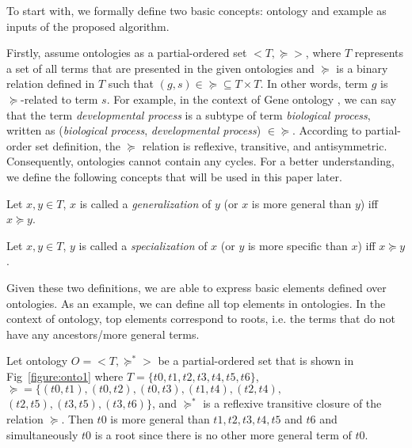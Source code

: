 

To start with, we formally define two basic concepts: ontology and example as inputs of the proposed algorithm. 

Firstly, assume ontologies as a partial-ordered set $<T,\succeq>$, where $T$ represents a set of all terms that are presented in the given ontologies and $\succeq$ is a binary relation defined in $T$ such that  $(g, s) \in \succeq \subseteq T \times T$. In other words, term $g$ is $\succeq$-related to term $s$. For example, in the context of Gene ontology \cite{ashburner2000gene,gene2016expansion}, we can say that the term \emph{developmental process} is a subtype of term \emph{biological process}, written as (\emph{biological process}, \emph{developmental process}) $\in \succeq$. According to partial-order set definition, the $\succeq$ relation is reflexive, transitive, and antisymmetric. Consequently, ontologies cannot contain any cycles. For a better understanding, we define the following concepts that will be used in this paper later. 

\begin{definition}
Let $x,y \in T$, $x$ is called a \emph{generalization} of $y$ (or $x$ is more general than $y$) iff $x \succeq y$.
\end{definition}

\begin{definition}
 Let $x,y \in T$, $y$ is called a \emph{specialization} of $x$ (or $y$ is more specific than $x$) iff $x \succeq y$.
\end{definition}

Given these two definitions, we are able to express basic elements defined over ontologies. As an example, we can define all top elements in ontologies. In the context of ontology, top elements correspond to roots, i.e. the terms that do not have any ancestors/more general terms.


\begin{example}\label{ex:onto}
    Let ontology $O = <T,\succeq^{*}>$ be a partial-ordered set that is shown in Fig~\ref{figure:onto1} where $T=\{t0,t1,t2,t3,t4,t5,t6\}$, $\succeq=\{(t0,t1), (t0,t2), (t0,t3), (t1,t4), (t2,t4),$ $(t2,t5), (t3,t5), (t3,t6)\}$, and $\succeq^{*}$ is a reflexive transitive closure of the relation $\succeq$. Then $t0$ is more general than $t1,t2,t3,t4,t5$ and $t6$ and simultaneously $t0$ is a root since there is no other more general term of $t0$.
\end{example}

